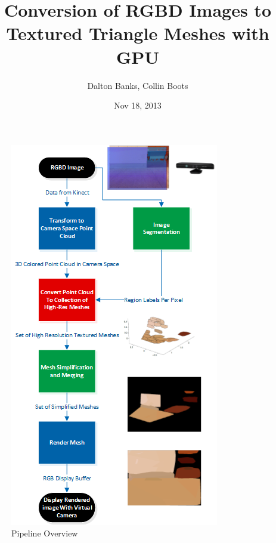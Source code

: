 \documentclass[letterpaper, 10 pt, conference]{ieeeconf}
\title{Conversion of RGBD Images to Textured Triangle Meshes with GPU}
\author{Dalton Banks, Collin Boots}
\date{Nov 18, 2013}
\begin{document}
   \maketitle




\begin{figure}[!ht]
    \centering
    \includegraphics[scale=1.0]{pipelineflowchart.png}
    \caption{Pipeline Overview}
    \label{fig:pipeline}
\end{figure}
\end{document}
